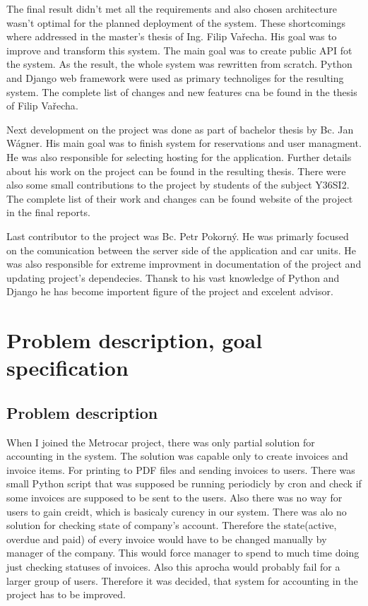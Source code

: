 \documentclass[11pt,twoside,a4paper]{book}
\begin{document}
The final result didn't met all the requirements and also chosen architecture
wasn't optimal for the planned deployment of  the system. These shortcomings
where addressed in the master's thesis of Ing. Filip Vařecha. His goal was to
improve and transform this system.  The main goal was to create public API fot
the system. As the result, the whole system was rewritten  from scratch.
Python and Django web framework were used as primary technoliges for the
resulting system. The complete list  of changes and new features cna be found
in the thesis of Filip Vařecha\cite{Varech10}. 

Next development on the project was done as part of bachelor thesis by Bc. Jan Wágner. His main goal was to 
finish system for reservations and user managment. He was also responsible for selecting hosting for the application. 
Further details about his work on the project can be found in the resulting thesis\cite{WagneJan}. There were also some 
small contributions to the project by students of the subject Y36SI2. The complete list of their work and changes can be found 
website of the project in the final reports\cite{assembla}. 

Last contributor to the project was Bc. Petr Pokorný. He was primarly focused on the comunication between the server side of the application and car units. He was also responsible for extreme improvment in documentation of the project and updating 
project's dependecies. Thansk to his vast knowledge of Python and Django he has become importent figure of the project 
and excelent advisor. 

\chapter{Problem description, goal specification}
\section{Problem description}
When I joined the Metrocar project, there was only partial solution for accounting in the system. The solution was capable only to create invoices and invoice items. For printing to PDF files and sending invoices to users. There was small Python script that was supposed be running periodicly by cron and check if some invoices are supposed to be sent to the users. Also there was no way for users to gain creidt, which is basicaly curency in our system. There was alo no solution for checking 
state of company's account. Therefore the state(active, overdue and paid) of every invoice would have to be changed manually by manager of the company. This would force manager to spend to much time doing just checking statuses of invoices. Also this 
aprocha would probably fail for a larger group of users. Therefore it was decided, that system for accounting in the project 
has to be improved.
\end{document}
